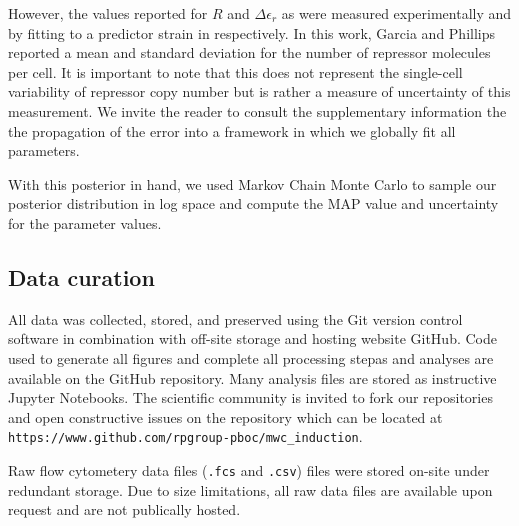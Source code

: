 However, the values reported for $R$ and $\Delta\epsilon_r$ as
were measured experimentally and by fitting to a predictor strain in  \citep{Garcia2011} respectively. In this work, Garcia and Phillips reported a
mean and standard deviation for the number of repressor molecules per cell. It
is important to note that this does not represent the single-cell variability
of repressor copy number but is rather a measure of uncertainty of this
measurement. We invite the reader to consult the supplementary information the
the propagation of the error into a framework in which we globally fit all
parameters.

With this posterior in hand, we used Markov Chain Monte Carlo to sample our
posterior distribution in log space and compute the MAP value and uncertainty
for the parameter values. 

\subsection*{Data curation}
All data was collected, stored, and preserved using the Git version control
software in combination with off-site storage and hosting website GitHub. Code
used to generate all figures and complete all processing stepas and analyses
are available on the GitHub repository. Many analysis files are stored as
instructive Jupyter Notebooks. The scientific community is invited to fork our
repositories and open constructive issues on the repository which can be
located at \texttt{https://www.github.com/rpgroup-pboc/mwc\_induction}.

Raw flow cytometery data files (\texttt{.fcs} and \texttt{.csv}) files were
stored on-site under redundant storage. Due to size limitations, all raw data
files are available upon request and are not publically hosted.
